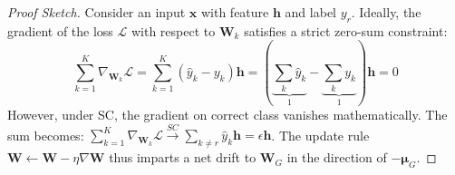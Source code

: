 \documentclass[10pt,a4paper]{amsart}
\begin{document}
\begin{proof}[Proof Sketch]
Consider an input $\bm{x}$ with feature $\bm{h}$ and label $y_r$. Ideally, the gradient of the loss $\mathcal{L}$ with respect to $\bm{W}_k$ satisfies a strict zero-sum constraint:
\begin{equation}
    \sum_{k=1}^K \nabla_{\bm{W}_k} \mathcal{L} = \sum_{k=1}^K (\hat{y}_k - y_k) \bm{h} = \left(\underbrace{\sum_k \hat{y}_k}_{1} - \underbrace{\sum_k y_k}_{1}\right) \bm{h} = 0 \label{eq:zero_sum}
\end{equation}  
However, under SC, the gradient on correct class vanishes mathematically. The sum becomes:
    $\sum_{k=1}^K \nabla_{\bm{W}_k} \mathcal{L} \xrightarrow{SC} \sum_{k \neq r} \hat{y}_k \bm{h} = \epsilon \bm{h}$.
The update rule $\bm{W} \leftarrow \bm{W} - \eta \nabla \bm{W}$ thus imparts a net drift to $\bm{W}_G$ in the direction of $-\bm{\mu}_G$.
\end{proof}
\end{document}
